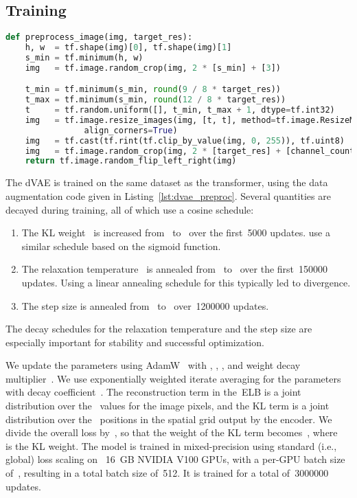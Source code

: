 \documentclass{article}
\begin{document}
\subsection{Training}
\label{sec:dvae_train}
\begin{lstlisting}[language=Python,basicstyle=\footnotesize\ttfamily,caption={TensorFlow~\cite{abadi2016tensorflow} image preprocessing code for training dVAE. We use \texttt{target\_res = 256} and \texttt{channel\_count = 3}.},label={lst:dvae_preproc},captionpos=b,float=tp,floatplacement=tbp]
def preprocess_image(img, target_res):
    h, w  = tf.shape(img)[0], tf.shape(img)[1]
    s_min = tf.minimum(h, w)
    img   = tf.image.random_crop(img, 2 * [s_min] + [3])

    t_min = tf.minimum(s_min, round(9 / 8 * target_res))
    t_max = tf.minimum(s_min, round(12 / 8 * target_res))
    t     = tf.random.uniform([], t_min, t_max + 1, dtype=tf.int32)
    img   = tf.image.resize_images(img, [t, t], method=tf.image.ResizeMethod.AREA,
                align_corners=True)
    img   = tf.cast(tf.rint(tf.clip_by_value(img, 0, 255)), tf.uint8)
    img   = tf.image.random_crop(img, 2 * [target_res] + [channel_count])
    return tf.image.random_flip_left_right(img)
\end{lstlisting}
The dVAE is trained on the same dataset as the transformer, using the data augmentation code given in Listing~\ref{lst:dvae_preproc}. Several quantities are decayed during training, all of which use a cosine schedule:
\begin{enumerate}
    \item The KL weight~ is increased from~ to~ over the first~\num{5000} updates. \citet{bowman2015generating} use a similar schedule based on the sigmoid function.
    \item The relaxation temperature~ is annealed from~ to~ over the first~\num{150000} updates. Using a linear annealing schedule for this typically led to divergence.
    \item The step size is annealed from~ to~ over~\num{1200000} updates.
\end{enumerate}
The decay schedules for the relaxation temperature and the step size are especially important for stability and successful optimization.

We update the parameters using AdamW~\cite{loshchilov2017decoupled} with , , , and weight decay multiplier~. We use exponentially weighted iterate averaging for the parameters with decay coefficient~. The reconstruction term in the~ELB is a joint distribution over the~ values for the image pixels, and the KL term is a joint distribution over the~ positions in the spatial grid output by the encoder. We divide the overall loss by~, so that the weight of the KL term becomes~, where~ is the KL weight. The model is trained in mixed-precision using standard (i.e., global) loss scaling on~ 16~GB NVIDIA V100 GPUs, with a per-GPU batch size of~, resulting in a total batch size of~512. It is trained for a total of~\num{3000000} updates.
\end{document}
